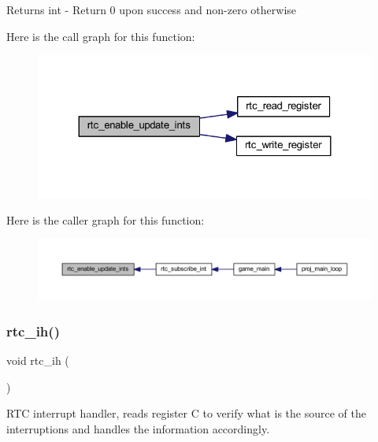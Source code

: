 \begin{DoxyReturn}{Returns}
int -\/ Return 0 upon success and non-\/zero otherwise 
\end{DoxyReturn}
Here is the call graph for this function\+:
\nopagebreak
\begin{figure}[H]
\begin{center}
\leavevmode
\includegraphics[width=324pt]{group__rtc_ga33036209deeaa3ca32027fdab0c8b2d7_cgraph}
\end{center}
\end{figure}
Here is the caller graph for this function\+:
\nopagebreak
\begin{figure}[H]
\begin{center}
\leavevmode
\includegraphics[width=350pt]{group__rtc_ga33036209deeaa3ca32027fdab0c8b2d7_icgraph}
\end{center}
\end{figure}
\mbox{\label{group__rtc_ga75dad42881d64cf07cf1bdc2979a7056}} 
\subsubsection{\texorpdfstring{rtc\+\_\+ih()}{rtc\_ih()}}
{\footnotesize\ttfamily void rtc\+\_\+ih (\begin{DoxyParamCaption}{ }\end{DoxyParamCaption})}



R\+TC interrupt handler, reads register C to verify what is the source of the interruptions and handles the information accordingly. 


